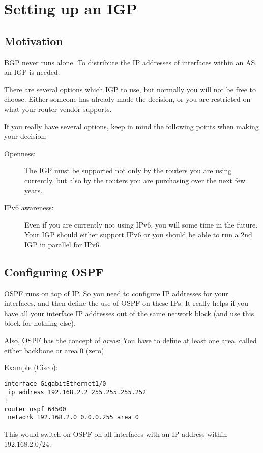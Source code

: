 \chapter{Setting up an \gls{IGP}}
\section{Motivation}
\gls{BGP} never runs alone. To distribute the IP addresses of interfaces
within an \gls{AS}, an \gls{IGP} is needed.

There are several options which \gls{IGP} to use, but normally you will not be free
to choose. Either someone has already made the decision, or you are restricted
on what your router vendor supports.

If you really have several options, keep in mind the following points when
making your decision:
\begin{description}
  \item[Openness:] The IGP must be supported not only by the routers you are using currently, but also by the routers you are purchasing over the next few years.
  \item[IPv6 awareness:] Even if you are currently not using IPv6, you will some time in the future. Your IGP should either support IPv6 or you should be able to run a 2nd IGP in parallel for IPv6.
\end{description}

\section{Configuring OSPF}
\gls{OSPF} runs on top of IP. So you need to configure IP addresses for your
interfaces, and then define the use of OSPF on these IPs. It really helps
if you have all your interface IP addresses out of the same network block
(and use this block for nothing else).

Also, OSPF has the concept of \emph{areas}: You have to define at least one area, called either backbone or area 0 (zero).

Example (Cisco):\label{example-ospf}
\begin{verbatim}
interface GigabitEthernet1/0
 ip address 192.168.2.2 255.255.255.252
!
router ospf 64500
 network 192.168.2.0 0.0.0.255 area 0
\end{verbatim}

This would switch on OSPF on all interfaces with an IP address within 192.168.2.0/24.

